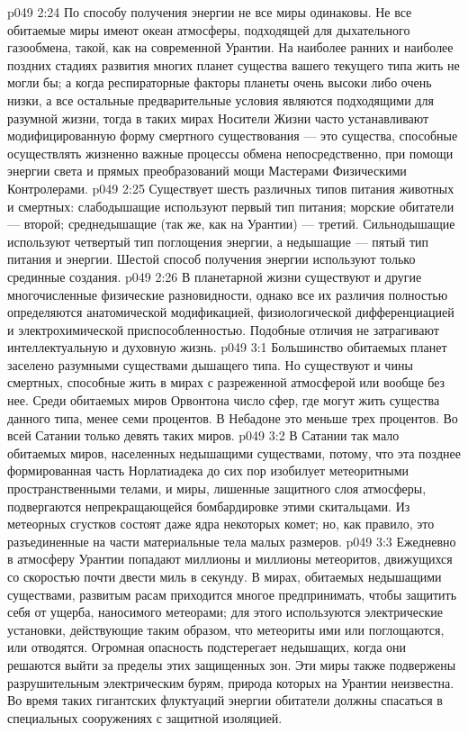 \vs p049 2:24 \bibnobreakspace {} По способу получения энергии не все миры одинаковы. Не все обитаемые миры имеют океан атмосферы, подходящей для дыхательного газообмена, такой, как на современной Урантии. На наиболее ранних и наиболее поздних стадиях развития многих планет существа вашего текущего типа жить не могли бы; а когда респираторные факторы планеты очень высоки либо очень низки, а все остальные предварительные условия являются подходящими для разумной жизни, тогда в таких мирах Носители Жизни часто устанавливают модифицированную форму смертного существования --- это существа, способные осуществлять жизненно важные процессы обмена непосредственно, при помощи энергии света и прямых преобразований мощи Мастерами Физическими Контролерами.
\vs p049 2:25 Существует шесть различных типов питания животных и смертных: слабодышащие используют первый тип питания; морские обитатели --- второй; среднедышащие (так же, как на Урантии) --- третий. Сильнодышащие используют четвертый тип поглощения энергии, а недышащие --- пятый тип питания и энергии. Шестой способ получения энергии используют только срединные создания.
\vs p049 2:26 \bibnobreakspace {} В планетарной жизни существуют и другие многочисленные физические разновидности, однако все их различия полностью определяются анатомической модификацией, физиологической дифференциацией и электрохимической приспособленностью. Подобные отличия не затрагивают интеллектуальную и духовную жизнь.
\vs p049 3:1 Большинство обитаемых планет заселено разумными существами дышащего типа. Но существуют и чины смертных, способные жить в мирах с разреженной атмосферой или вообще без нее. Среди обитаемых миров Орвонтона число сфер, где могут жить существа данного типа, менее семи процентов. В Небадоне это меньше трех процентов. Во всей Сатании только девять таких миров.
\vs p049 3:2 В Сатании так мало обитаемых миров, населенных недышащими существами, потому, что эта позднее формированная часть Норлатиадека до сих пор изобилует метеоритными пространственными телами, и миры, лишенные защитного слоя атмосферы, подвергаются непрекращающейся бомбардировке этими скитальцами. Из метеорных сгустков состоят даже ядра некоторых комет; но, как правило, это разъединенные на части материальные тела малых размеров.
\vs p049 3:3 Ежедневно в атмосферу Урантии попадают миллионы и миллионы метеоритов, движущихся со скоростью почти двести миль в секунду. В мирах, обитаемых недышащими существами, развитым расам приходится многое предпринимать, чтобы защитить себя от ущерба, наносимого метеорами; для этого используются электрические установки, действующие таким образом, что метеориты ими или поглощаются, или отводятся. Огромная опасность подстерегает недышащих, когда они решаются выйти за пределы этих защищенных зон. Эти миры также подвержены разрушительным электрическим бурям, природа которых на Урантии неизвестна. Во время таких гигантских флуктуаций энергии обитатели должны спасаться в специальных сооружениях с защитной изоляцией.
